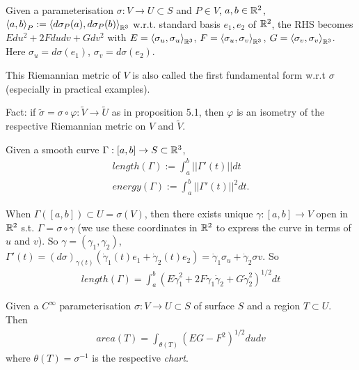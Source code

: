 \documentclass[a4paper]{article}
\begin{document}
Given a parameterisation $\sigma: V \to U \subset S$ and $P \in V$, $a,b \in \mathbb{R}^2$, $\left<a,b\right>_P:=\left<d\sigma_P(a),d\sigma_P(b)\right>_{\mathbb{R}^3}$ w.r.t. standard basis $e_1,e_2$ of $\mathbb{R}^2$, the RHS becomes $E du^2 +2Fdudv+Gdv^2$ with $E = \left<\sigma_u,\sigma_u\right>_{\mathbb{R}^3}$, $F = \left<\sigma_u,\sigma_v\right>_{\mathbb{R}^3}$, $G = \left<\sigma_v,\sigma_v\right>_{\mathbb{R}^3}$. Here $\sigma_u = d\sigma (e_1)$, $\sigma_v = d\sigma (e_2)$.

This Riemannian metric of $V$ is also called the first fundamental form w.r.t $\sigma$ (especially in practical examples).

Fact: if $\tilde{\sigma} = \sigma \circ \varphi: \tilde{V} \to \tilde{U}$ as in proposition 5.1, then $\varphi$ is an isometry of the respective Riemannian metric on $V $ and $\tilde{V}$.

\begin{defi}
Given a smooth curve $\Gamma:[a,b] \to S \subset \mathbb{R}^3$,
\begin{equation*}
\begin{aligned}
length(\Gamma) := \int_a^b ||\Gamma'(t)|| dt\\
energy(\Gamma) := \int_a^b ||\Gamma'(t)||^2 dt.
\end{aligned}
\end{equation*}
\end{defi}

When $\Gamma([a,b]) \subset U = \sigma(V)$, then there exists unique $\gamma:[a,b] \to V$ open in $\mathbb{R}^2$ s.t. $\Gamma = \sigma \circ \gamma$ (we use these coordinates in $\mathbb{R}^2$ to express the curve in terms of $u$ and $v$). So $\gamma=(\gamma_1,\gamma_2)$, $\Gamma'(t) = (d\sigma)_{\gamma(t)} (\dot{\gamma}_1 (t) e_1 + \dot{\gamma}_2(t) e_2) = \dot{\gamma}_1 \sigma_u + \dot{\gamma}_2 \sigma v$. So
\begin{equation*}
\begin{aligned}
length(\Gamma) = \int_a^b \left(E \dot{\gamma}_1^2 + 2F\dot{\gamma}_1\dot{\gamma}_2 + G\dot{\gamma}_2^2\right)^{1/2} dt
\end{aligned}
\end{equation*}

\begin{defi}
Given a $C^\infty$ parameterisation $\sigma:V \to U \subset S$ of surface $S$ and a region $T \subset U$. Then 
\begin{equation*}
\begin{aligned}
area(T) = \int_{\theta(T)} (EG-F^2)^{1/2} dudv
\end{aligned}
\end{equation*}
where $\theta(T) = \sigma^{-1}$ is the respective \emph{chart}.
\end{defi}
\end{document}
